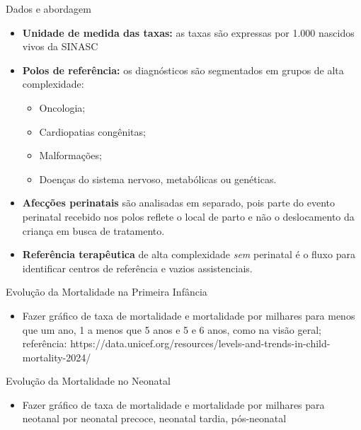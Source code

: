 \documentclass[
  ignorenonframetext,
  brazilian,
]{beamer}
\providecommand{\tightlist}{%
  \setlength{\itemsep}{0pt}\setlength{\parskip}{0pt}}
\begin{document}
\begin{frame}{Dados e abordagem}
\protect{}\label{dados-e-abordagem-2}
\begin{itemize}
\item
  \textbf{Unidade de medida das taxas:} as taxas são expressas por 1.000
  nascidos vivos da SINASC\\
\item
  \textbf{Polos de referência:} os diagnósticos são segmentados em
  grupos de alta complexidade:\\

  \begin{itemize}
  \tightlist
  \item
    Oncologia;\\
  \item
    Cardiopatias congênitas;\\
  \item
    Malformações;\\
  \item
    Doenças do sistema nervoso, metabólicas ou genéticas.\\
  \end{itemize}
\item
  \textbf{Afecções perinatais} são analisadas em separado, pois parte do
  evento perinatal recebido nos polos reflete o local de parto e não o
  deslocamento da criança em busca de tratamento.\\
\item
  \textbf{Referência terapêutica} de alta complexidade \emph{sem}
  perinatal é o fluxo para identificar centros de referência e vazios
  assistenciais.\\
\end{itemize}
\end{frame}

\begin{frame}{Evolução da Mortalidade na Primeira Infância}
\protect{}\label{evoluuxe7uxe3o-da-mortalidade-na-primeira-infuxe2ncia}
\begin{itemize}
\tightlist
\item
  Fazer gráfico de taxa de mortalidade e mortalidade por milhares para
  menos que um ano, 1 a menos que 5 anos e 5 e 6 anos, como na visão
  geral; referência:
  https://data.unicef.org/resources/levels-and-trends-in-child-mortality-2024/
\end{itemize}
\end{frame}

\begin{frame}{Evolução da Mortalidade no Neonatal}
\protect{}\label{evoluuxe7uxe3o-da-mortalidade-no-neonatal}
\begin{itemize}
\tightlist
\item
  Fazer gráfico de taxa de mortalidade e mortalidade por milhares para
  neotanal por neonatal precoce, neonatal tardia, pós-neonatal
\end{itemize}
\end{frame}
\end{document}
